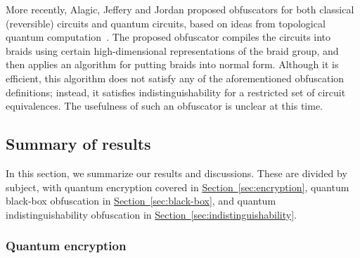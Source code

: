 \documentclass[11pt]{article}
\numberwithin{equation}{section}
\newcommand{\expref}[2]{\texorpdfstring{\hyperref[#2]{#1~\ref{#2}}}{#1~\ref{#2}}}
\begin{document}
{More recently, Alagic, Jeffery and Jordan proposed obfuscators for both classical (reversible) circuits and quantum circuits, based on ideas from topological quantum computation~\cite{ASS14}. The proposed obfuscator compiles the circuits into braids using certain high-dimensional representations of the braid group, and then applies an algorithm for putting braids into normal form. Although it is efficient, this algorithm does not satisfy any of the aforementioned obfuscation definitions; instead, it satisfies indistinguishability for a restricted set of circuit equivalences. The usefulness of such an obfuscator is unclear at this time.


\subsection{Summary of results}

In this section, we summarize our results and discussions. These are divided by subject, with quantum encryption covered in \expref{Section}{sec:encryption}, quantum black-box obfuscation in \expref{Section}{sec:black-box}, and quantum indistinguishability obfuscation in \expref{Section}{sec:indistinguishability}.

\subsubsection{Quantum encryption}

}
\end{document}
